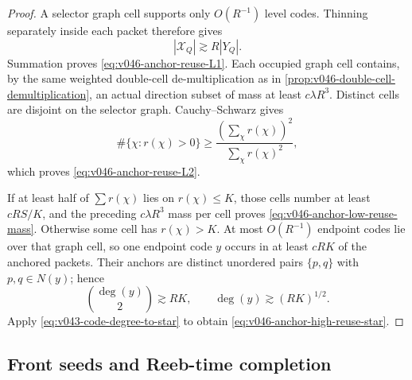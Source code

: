 \documentclass[10pt]{article}
\begin{document}
\begin{proof}
A selector graph cell supports only \(O(R^{-1})\) level codes.  Thinning separately inside each
packet therefore gives
\[
|\mathscr X_Q|\gtrsim R|Y_Q|.
\]
Summation proves \eqref{eq:v046-anchor-reuse-L1}.  Each occupied graph cell contains, by the same
weighted double-cell de-multiplication as in
\cref{prop:v046-double-cell-demultiplication}, an actual direction subset of mass at least
\(c\lambda R^3\).  Distinct cells are disjoint on the selector graph.  Cauchy--Schwarz gives
\[
\#\{\chi:r(\chi)>0\}
\ge
\frac{(\sum_\chi r(\chi))^2}{\sum_\chi r(\chi)^2},
\]
which proves \eqref{eq:v046-anchor-reuse-L2}.

If at least half of \(\sum r(\chi)\) lies on \(r(\chi)\le K\), those cells number at least
\(cRS/K\), and the preceding \(c\lambda R^3\) mass per cell proves
\eqref{eq:v046-anchor-low-reuse-mass}.  Otherwise some cell has \(r(\chi)>K\).  At most
\(O(R^{-1})\) endpoint codes lie over that graph cell, so one endpoint code \(y\) occurs in at least
\(cRK\) of the anchored packets.  Their anchors are distinct unordered pairs \(\{p,q\}\) with
\(p,q\in N(y)\); hence
\[
\binom{\deg(y)}2\gtrsim RK,
\qquad
\deg(y)\gtrsim(RK)^{1/2}.
\]
Apply \eqref{eq:v043-code-degree-to-star} to obtain
\eqref{eq:v046-anchor-high-reuse-star}.
\end{proof}

\subsection{Front seeds and Reeb-time completion}
\end{document}
